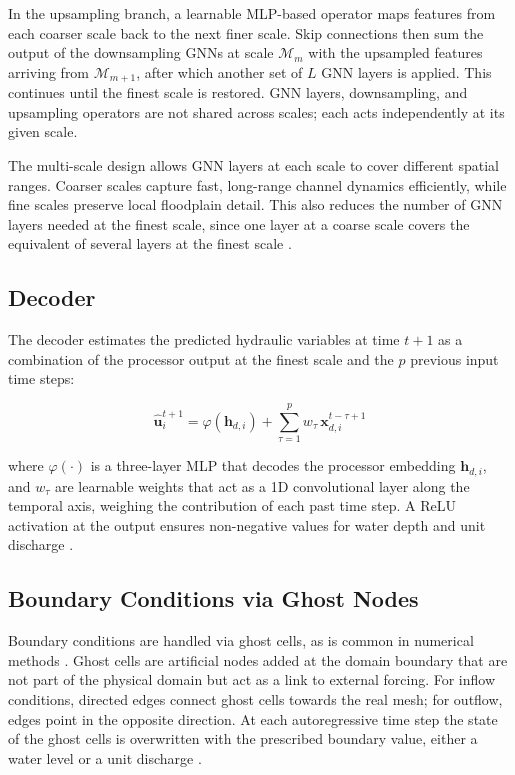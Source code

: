 \documentclass[12pt,a4paper]{report}
\begin{document}
In the upsampling branch, a learnable MLP-based operator maps features from
each coarser scale back to the next finer scale. Skip connections then sum the output of
the downsampling GNNs at scale $\mathcal{M}_m$ with the upsampled features arriving
from $\mathcal{M}_{m+1}$, after which another set of $L$ GNN layers is applied. This
continues until the finest scale is restored. GNN layers, downsampling, and upsampling
operators are not shared across scales; each acts independently at its given scale.
 
The multi-scale design allows GNN layers at each scale to cover different spatial ranges.
Coarser scales capture fast, long-range channel dynamics efficiently, while fine scales
preserve local floodplain detail. This also reduces the number of GNN layers needed at
the finest scale, since one layer at a coarse scale covers the equivalent of several
layers at the finest scale \citep{bentivoglio2025mswegnn}.
 
\subsection{Decoder}
\label{subsec:decoder}
 
The decoder estimates the predicted hydraulic variables at time $t+1$ as a combination
of the processor output at the finest scale and the $p$ previous input time steps:
 
\begin{equation}
    \hat{\mathbf{u}}_i^{t+1} = \varphi\!\left(\mathbf{h}_{d,i}\right) +
    \sum_{\tau=1}^{p} w_\tau \, \mathbf{x}_{d,i}^{t-\tau+1}
    \label{eq:decoder}
\end{equation}
 
where $\varphi(\cdot)$ is a three-layer MLP that decodes the processor embedding
$\mathbf{h}_{d,i}$, and $w_\tau$ are learnable weights that act as a 1D convolutional
layer along the temporal axis, weighing the contribution of each past time step. A ReLU
activation at the output ensures non-negative values for water depth and unit discharge
\citep{bentivoglio2025mswegnn}.
 
\subsection{Boundary Conditions via Ghost Nodes}
\label{subsec:ghost_nodes}
 
Boundary conditions are handled via ghost cells, as is common in numerical methods
\citep{leveque2002finite}. Ghost cells are artificial nodes added at the domain boundary that are
not part of the physical domain but act as a link to external forcing. For inflow
conditions, directed edges connect ghost cells towards the real mesh; for outflow, edges
point in the opposite direction. At each autoregressive time step the state of the ghost
cells is overwritten with the prescribed boundary value, either a water level or a unit
discharge \citep{bentivoglio2025mswegnn}.
 
\end{document}
